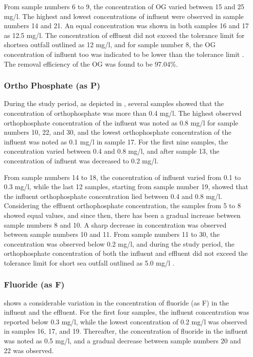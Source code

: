 From sample numbers 6 to 9, the concentration of \ac{OG} varied between 15 and 25 mg/l. The highest and lowest concentrations of influent were observed in sample numbers 14 and 21. An equal concentration was shown in both samples 16 and 17 as 12.5 mg/l. The concentration of effluent did not exceed the tolerance limit for shortsea outfall outlined as 12 mg/l, and for sample number 8, the \ac{OG} concentration of influent too was indicated to be lower than the tolerance limit \cite{CEA2022}. The removal efficiency of the \ac{OG} was found to be 97.04\%.\\




\subsubsection{Ortho Phosphate (as P)}
During the study period, as depicted in , several samples showed that the concentration of orthophosphate was more than 0.4 mg/l. The highest observed orthophosphate concentration of the influent was noted as 0.8 mg/l for sample numbers 10, 22, and 30, and the lowest orthophosphate concentration of the influent was noted as 0.1 mg/l in sample 17. For the first nine samples, the concentration varied between 0.4 and 0.8 mg/l, and after sample 13, the concentration of influent was decreased to 0.2 mg/l.

From sample numbers 14 to 18, the concentration of influent varied from 0.1 to 0.3 mg/l, while the last 12 samples, starting from sample number 19, showed that the influent orthophosphate concentration lied between 0.4 and 0.8 mg/l. Considering the effluent orthophosphate concentration, the samples from 5 to 8 showed equal values, and since then, there has been a gradual increase between sample numbers 8 and 10. A sharp decrease in concentration was observed between sample numbers 10 and 11. From sample numbers 11 to 30, the concentration was observed below 0.2 mg/l, and during the study period, the orthophosphate concentration of both the influent and effluent did not exceed the tolerance limit for short sea outfall outlined as 5.0 mg/l \cite{CEA2022}. 



\subsubsection{Fluoride (as F)}
 shows a considerable variation in the concentration of fluoride (as F) in the influent and the effluent. For the first four samples, the influent concentration was reported below 0.3 mg/l, while the lowest concentration of 0.2 mg/l was observed in samples 16, 17, and 19. Thereafter, the concentration of fluoride in the influent was noted as 0.5 mg/l, and a gradual decrease between sample numbers 20 and 22 was observed.

